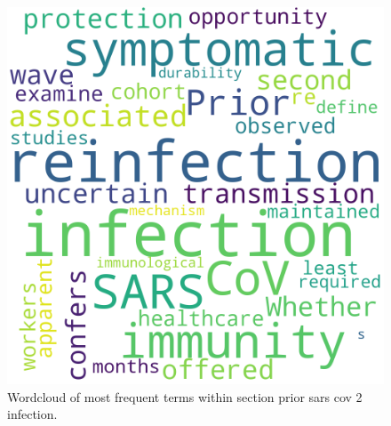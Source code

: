 \documentclass{qqtarticle}
\begin{document}
        \begin{figure}[H]
            \centering
            \includegraphics[width=.75\linewidth]{img/priorsarscov2infection.png}
            \caption{Wordcloud of most frequent terms within section prior sars cov 2 infection.}
            \label{fig:wcl_priorsarscov2infection}
        \end{figure}
\end{document}
